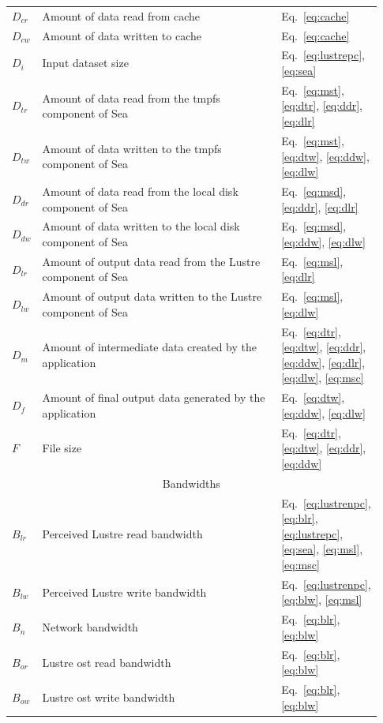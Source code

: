 \documentclass{report}
\begin{document}
\begin{table}[h!]
\begin{tabular}{|p{0.03\linewidth}|p{0.7\linewidth}|p{0.2\linewidth}|}
     $D_{cr}$ & Amount of data read from cache & Eq.~\ref{eq:cache}\\
     $D_{cw}$ & Amount of data written to cache & Eq.~\ref{eq:cache}\\
     $D_{i}$ & Input dataset size & Eq.~\ref{eq:lustrepc}, \ref{eq:sea}\\
     $D_{tr}$ & Amount of data read from the tmpfs component of Sea & Eq.~\ref{eq:mst}, \ref{eq:dtr}, \ref{eq:ddr}, \ref{eq:dlr} \\
     $D_{tw}$ & Amount of data written to the tmpfs component of Sea & Eq.~\ref{eq:mst}, \ref{eq:dtw}, \ref{eq:ddw}, \ref{eq:dlw} \\
     $D_{dr}$ & Amount of data read from the local disk component of Sea & Eq.~\ref{eq:msd}, \ref{eq:ddr}, \ref{eq:dlr} \\
     $D_{dw}$ & Amount of data written to the local disk component of Sea & Eq.~\ref{eq:msd}, \ref{eq:ddw}, \ref{eq:dlw} \\
     $D_{lr}$ & Amount of output data read from the Lustre component of Sea & Eq.~\ref{eq:msl}, \ref{eq:dlr} \\
     $D_{lw}$ & Amount of output data written to the Lustre component of Sea & Eq.~\ref{eq:msl}, \ref{eq:dlw} \\
     $D_{m}$ & Amount of intermediate data created by the application & Eq.~\ref{eq:dtr}, \ref{eq:dtw}, \ref{eq:ddr}, \ref{eq:ddw}, \ref{eq:dlr}, \ref{eq:dlw}, \ref{eq:msc} \\
     $D_{f}$ & Amount of final output data generated by the application & Eq.~\ref{eq:dtw}, \ref{eq:ddw}, \ref{eq:dlw} \\ 
     $F$ & File size & Eq.~\ref{eq:dtr}, \ref{eq:dtw}, \ref{eq:ddr}, \ref{eq:ddw}\\
     \hline
     \multicolumn{3}{|c|}{Bandwidths} \\
     \hline
     $B_{lr}$ & Perceived Lustre read bandwidth & Eq.~\ref{eq:lustrenpc}, \ref{eq:blr}, \ref{eq:lustrepc}, \ref{eq:sea}, \ref{eq:msl}, \ref{eq:msc}\\
     $B_{lw}$ & Perceived Lustre write bandwidth & Eq.~\ref{eq:lustrenpc}, \ref{eq:blw}, \ref{eq:msl}\\
     $B_{n}$ & Network bandwidth & Eq.~\ref{eq:blr}, \ref{eq:blw}\\
     $B_{or}$ & Lustre \gls{ost} read bandwidth & Eq.~\ref{eq:blr}, \ref{eq:blw}\\
     $B_{ow}$ & Lustre \gls{ost} write bandwidth & Eq.~\ref{eq:blr}, \ref{eq:blw}\\

\end{tabular}
\end{table}
\end{document}
